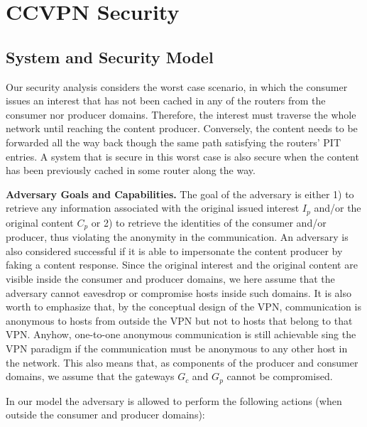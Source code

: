 \section{CCVPN Security}\label{sec:sec-analysis}


\subsection{System and Security Model}

Our security analysis considers the worst case scenario, in which the consumer issues an interest that has not been cached in any of the routers from the consumer nor producer domains. Therefore, the interest must traverse the whole network until reaching the content producer. Conversely, the content needs to be forwarded all the way back though the same path satisfying the routers' PIT entries. A system that is secure in this worst case is also secure when the content has been previously cached in some router along the way.

\textbf{Adversary Goals and Capabilities.} The goal of the adversary is either 1) to retrieve any information associated with the original issued interest $I_p$ and/or the original content $C_p$ or 2) to retrieve the identities of the consumer and/or producer, thus violating the anonymity in the communication. An adversary is also considered successful if it is able to impersonate the content producer by faking a content response. Since the original interest and the original content are visible inside the consumer and producer domains, we here assume that the adversary cannot eavesdrop or compromise hosts inside such domains. It is also worth to emphasize that, by the conceptual design of the VPN, communication is anonymous to hosts from outside the VPN but not to hosts that belong to that VPN. Anyhow, one-to-one anonymous communication is still achievable sing the VPN paradigm if the communication must be anonymous to any other host in the network. This also means that, as components of the producer and consumer domains, we assume that the gateways $G_c$ and $G_p$ cannot be compromised.

In our model the adversary is allowed to perform the following actions (when outside the consumer and producer domains):

